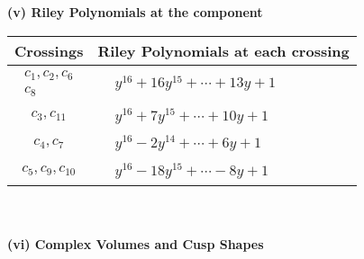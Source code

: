 \documentclass[1p]{elsarticle_modified}
\theoremstyle{definition}
\begin{document}
\newpage\renewcommand{\arraystretch}{1}
\flushleft \textbf{(v) Riley Polynomials at the component}\newline \\
\begin{tabular}{m{50pt}|m{274pt}}
Crossings & \hspace{64pt}Riley Polynomials at each crossing \\
\hline $$\begin{aligned}c_{1},c_{2},c_{6}\\c_{8}\end{aligned}$$&$\begin{aligned}
&y^{16}+16 y^{15}+\cdots+13 y+1
\end{aligned}$\\
\hline $$\begin{aligned}c_{3},c_{11}\end{aligned}$$&$\begin{aligned}
&y^{16}+7 y^{15}+\cdots+10 y+1
\end{aligned}$\\
\hline $$\begin{aligned}c_{4},c_{7}\end{aligned}$$&$\begin{aligned}
&y^{16}-2 y^{14}+\cdots+6 y+1
\end{aligned}$\\
\hline $$\begin{aligned}c_{5},c_{9},c_{10}\end{aligned}$$&$\begin{aligned}
&y^{16}-18 y^{15}+\cdots-8 y+1
\end{aligned}$\\
\hline
\end{tabular}\\~\\
\newpage\flushleft \textbf{(vi) Complex Volumes and Cusp Shapes}
\end{document}
